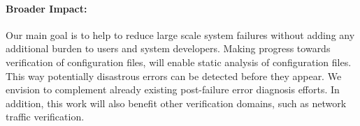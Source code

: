 \paragraph{Broader Impact:} 
Our main goal is to help to reduce large scale system failures without adding any additional burden to users and system developers. 
Making progress towards verification of configuration files, will enable static analysis of configuration files. This way potentially disastrous errors can be 
detected before they appear.
We envision \app to complement already existing post-failure error diagnosis efforts.
In addition, this work will also benefit other verification domains, such as network traffic verification. 

